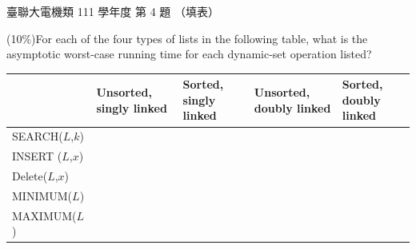 \begin{pastexam}[label={px:ust-111-ee-ds-04}]{臺聯大電機類 111 學年度 第 4 題}
（填表）

(10\%)For each of the four types of lists in the following table, what is the asymptotic worst-case
running time for each dynamic-set operation listed?

\begin{center}
\begin{tabular}{|l|p{2.2cm}|p{2.2cm}|p{2.2cm}|p{2.2cm}|}\hline
 & \centering Unsorted, singly linked & \centering Sorted, singly linked & \centering Unsorted, doubly linked & \centering\arraybackslash Sorted, doubly linked\\\hline
SEARCH($L$,$k$) & & & & \\\hline
INSERT ($L$,$x$) & & & & \\\hline
Delete($L$,$x$) & & & & \\\hline
MINIMUM($L$) & & & & \\\hline
MAXIMUM($L$) & & & & \\\hline
\end{tabular}
\end{center}
\end{pastexam}

